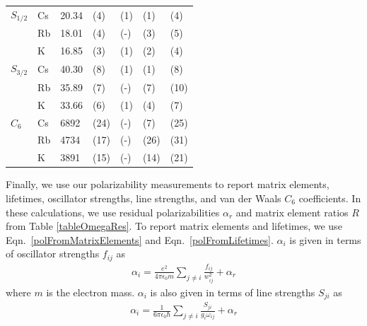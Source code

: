 \documentclass[twocolumn,prl,showpacs,superscriptaddress,longbibliography]{revtex4-1}   %
\newcommand{\eqnref}[1]{Eqn.~\eqref{#1}}
\begin{document}
\begin{table}
\begin{center}
\begin{tabular}{lllllll}
$S_{1/2}$ 			& Cs & 20.34 & (4) & (1) & (1) & (4) \\
 					& Rb & 18.01 & (4) & (-) & (3) & (5) \\
 					& K  & 16.85 & (3) & (1) & (2) & (4) \\ \hline
$S_{3/2}$ 			& Cs & 40.30 & (8) & (1) & (1) & (8) \\
 					& Rb & 35.89 & (7) & (-) & (7) & (10) \\
 					& K  & 33.66 & (6) & (1) & (4) & (7) \\ \hline
$C_6$ 				& Cs & 6892 & (24) & (-) & (7) & (25) \\ 
					& Rb & 4734 & (17) & (-) & (26) & (31) \\
 					& K  & 3891 & (15) & (-) & (14) & (21) \\ \hline
\hline
\end{tabular}
\end{center}
\end{table}
\endgroup


Finally, we use our polarizability measurements to report matrix elements, lifetimes, oscillator strengths, line strengths, and van der Waals $C_6$ coefficients.
In these calculations, we use residual polarizabilities $\alpha_r$ and matrix element ratios $R$ from Table \ref{tableOmegaRes}.
To report matrix elements and lifetimes, we use \eqnref{polFromMatrixElements} and \eqnref{polFromLifetimes}. $\alpha_i$ is given in terms of oscillator strengths $f_{ij}$ as 
\begin{align}
	\alpha_i = \frac{e^2}{4 \pi \epsilon_0 m}
	\sum_{j \neq i}
	\frac{f_{ij}}{w_{ij}^2}
	+ \alpha_r
	\label{polFromOscStr}
\end{align}
where $m$ is the electron mass. 
$\alpha_i$ is also given in terms of line strengths $S_{ji}$ as
\begin{align}
	\alpha_i = \frac{1}{6\pi\epsilon_0\hbar} 
	\sum_{j \neq i} 
	\frac{S_{ji}}{g_i\omega_{ij}}
	+ \alpha_r
	\label{polFromLineStr}
\end{align}
\end{document}
